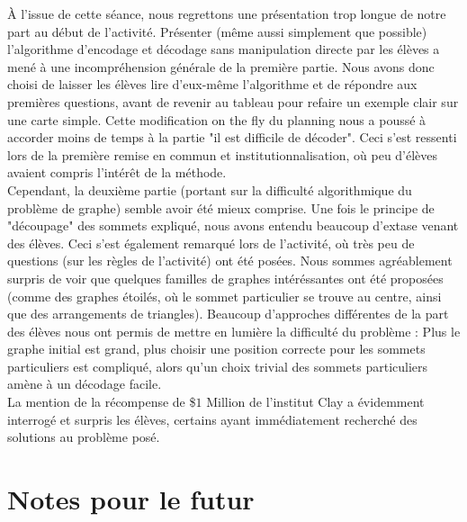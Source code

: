 \documentclass{article}
\begin{document}
À l'issue de cette séance, nous regrettons une présentation trop longue de notre part au début de l'activité. Présenter (même aussi simplement que possible) l'algorithme d'encodage et décodage sans manipulation directe par les élèves a mené à une incompréhension générale de la première partie. Nous avons donc choisi de laisser les élèves lire d'eux-même l'algorithme et de répondre aux premières questions, avant de revenir au tableau pour refaire un exemple clair sur une carte simple. Cette modification on the fly du planning nous a poussé à accorder moins de temps à la partie "il est difficile de décoder". Ceci s'est ressenti lors de la première remise en commun et institutionnalisation, où peu d'élèves avaient compris l'intérêt de la méthode.\\

Cependant, la deuxième partie (portant sur la difficulté algorithmique du problème de graphe) semble avoir été mieux comprise. Une fois le principe de "découpage" des sommets expliqué, nous avons entendu beaucoup d'extase venant des élèves. Ceci s'est également remarqué lors de l'activité, où très peu de questions (sur les règles de l'activité) ont été posées. Nous sommes agréablement surpris de voir que quelques familles de graphes intéréssantes ont été proposées (comme des graphes étoilés, où le sommet particulier se trouve au centre, ainsi que des arrangements de triangles). Beaucoup d'approches différentes de la part des élèves nous ont permis de mettre en lumière la difficulté du problème : Plus le graphe initial est grand, plus choisir une position correcte pour les sommets particuliers est compliqué, alors qu'un choix trivial des sommets particuliers amène à un décodage facile.\\

La mention de la récompense de \$$1$ Million de l'institut Clay a évidemment interrogé et surpris les élèves, certains ayant immédiatement recherché des solutions au problème posé.




\vspace{2em}


\section{Notes pour le futur}
\end{document}
